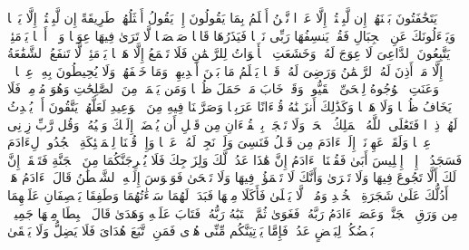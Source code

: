 \startbuffer[\q:20:103]
یَتَخَٰفَتُونَ بَیۡنَهُمۡ إِن لَّبِثۡتُمۡ إِلَّا عَشۡرࣰا%
\stopbuffer
\startbuffer[\q:20:104]
نَّحۡنُ أَعۡلَمُ بِمَا یَقُولُونَ إِذۡ یَقُولُ أَمۡثَلُهُمۡ طَرِیقَةً إِن لَّبِثۡتُمۡ إِلَّا یَوۡمࣰا%
\stopbuffer
\startbuffer[\q:20:105]
وَیَسۡءَلُونَكَ عَنِ ٱلۡجِبَالِ فَقُلۡ یَنسِفُهَا رَبِّی نَسۡفࣰا%
\stopbuffer
\startbuffer[\q:20:106]
فَیَذَرُهَا قَاعࣰا صَفۡصَفࣰا%
\stopbuffer
\startbuffer[\q:20:107]
لَّا تَرَىٰ فِیهَا عِوَجࣰا وَلَاۤ أَمۡتࣰا%
\stopbuffer
\startbuffer[\q:20:108]
یَوۡمَئِذࣲ یَتَّبِعُونَ ٱلدَّاعِیَ لَا عِوَجَ لَهُۥۖ وَخَشَعَتِ ٱلۡأَصۡوَاتُ لِلرَّحۡمَٰنِ فَلَا تَسۡمَعُ إِلَّا هَمۡسࣰا%
\stopbuffer
\startbuffer[\q:20:109]
یَوۡمَئِذࣲ لَّا تَنفَعُ ٱلشَّفَٰعَةُ إِلَّا مَنۡ أَذِنَ لَهُ ٱلرَّحۡمَٰنُ وَرَضِیَ لَهُۥ قَوۡلࣰا%
\stopbuffer
\startbuffer[\q:20:110]
یَعۡلَمُ مَا بَیۡنَ أَیۡدِیهِمۡ وَمَا خَلۡفَهُمۡ وَلَا یُحِیطُونَ بِهِۦ عِلۡمࣰا%
\stopbuffer
\startbuffer[\q:20:111]
۞ وَعَنَتِ ٱلۡوُجُوهُ لِلۡحَیِّ ٱلۡقَیُّومِۖ وَقَدۡ خَابَ مَنۡ حَمَلَ ظُلۡمࣰا%
\stopbuffer
\startbuffer[\q:20:112]
وَمَن یَعۡمَلۡ مِنَ ٱلصَّٰلِحَٰتِ وَهُوَ مُؤۡمِنࣱ فَلَا یَخَافُ ظُلۡمࣰا وَلَا هَضۡمࣰا%
\stopbuffer
\startbuffer[\q:20:113]
وَكَذَٰلِكَ أَنزَلۡنَٰهُ قُرۡءَانًا عَرَبِیࣰّا وَصَرَّفۡنَا فِیهِ مِنَ ٱلۡوَعِیدِ لَعَلَّهُمۡ یَتَّقُونَ أَوۡ یُحۡدِثُ لَهُمۡ ذِكۡرࣰا%
\stopbuffer
\startbuffer[\q:20:114]
فَتَعَٰلَى ٱللَّهُ ٱلۡمَلِكُ ٱلۡحَقُّۗ وَلَا تَعۡجَلۡ بِٱلۡقُرۡءَانِ مِن قَبۡلِ أَن یُقۡضَىٰۤ إِلَیۡكَ وَحۡیُهُۥۖ وَقُل رَّبِّ زِدۡنِی عِلۡمࣰا%
\stopbuffer
\startbuffer[\q:20:115]
وَلَقَدۡ عَهِدۡنَاۤ إِلَىٰۤ ءَادَمَ مِن قَبۡلُ فَنَسِیَ وَلَمۡ نَجِدۡ لَهُۥ عَزۡمࣰا%
\stopbuffer
\startbuffer[\q:20:116]
وَإِذۡ قُلۡنَا لِلۡمَلَٰۤئِكَةِ ٱسۡجُدُوا۟ لِءَادَمَ فَسَجَدُوۤا۟ إِلَّاۤ إِبۡلِیسَ أَبَىٰ%
\stopbuffer
\startbuffer[\q:20:117]
فَقُلۡنَا یَٰۤءَادَمُ إِنَّ هَٰذَا عَدُوࣱّ لَّكَ وَلِزَوۡجِكَ فَلَا یُخۡرِجَنَّكُمَا مِنَ ٱلۡجَنَّةِ فَتَشۡقَىٰۤ%
\stopbuffer
\startbuffer[\q:20:118]
إِنَّ لَكَ أَلَّا تَجُوعَ فِیهَا وَلَا تَعۡرَىٰ%
\stopbuffer
\startbuffer[\q:20:119]
وَأَنَّكَ لَا تَظۡمَؤُا۟ فِیهَا وَلَا تَضۡحَىٰ%
\stopbuffer
\startbuffer[\q:20:120]
فَوَسۡوَسَ إِلَیۡهِ ٱلشَّیۡطَٰنُ قَالَ یَٰۤءَادَمُ هَلۡ أَدُلُّكَ عَلَىٰ شَجَرَةِ ٱلۡخُلۡدِ وَمُلۡكࣲ لَّا یَبۡلَىٰ%
\stopbuffer
\startbuffer[\q:20:121]
فَأَكَلَا مِنۡهَا فَبَدَتۡ لَهُمَا سَوۡءَٰتُهُمَا وَطَفِقَا یَخۡصِفَانِ عَلَیۡهِمَا مِن وَرَقِ ٱلۡجَنَّةِۚ وَعَصَىٰۤ ءَادَمُ رَبَّهُۥ فَغَوَىٰ%
\stopbuffer
\startbuffer[\q:20:122]
ثُمَّ ٱجۡتَبَٰهُ رَبُّهُۥ فَتَابَ عَلَیۡهِ وَهَدَىٰ%
\stopbuffer
\startbuffer[\q:20:123]
قَالَ ٱهۡبِطَا مِنۡهَا جَمِیعَۢاۖ بَعۡضُكُمۡ لِبَعۡضٍ عَدُوࣱّۖ فَإِمَّا یَأۡتِیَنَّكُم مِّنِّی هُدࣰى فَمَنِ ٱتَّبَعَ هُدَایَ فَلَا یَضِلُّ وَلَا یَشۡقَىٰ%

